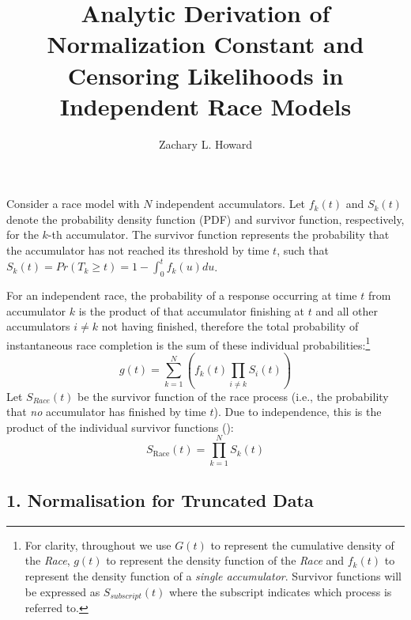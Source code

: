 \documentclass[12pt,a4paper,one side]{article}
\author{Zachary L. Howard}
\title{Analytic Derivation of Normalization Constant and Censoring Likelihoods in Independent Race Models}
\begin{document}
\maketitle

Consider a race model with $N$ independent accumulators. Let $f_k(t)$ and $S_k(t)$ denote the probability density function (PDF) and survivor function, respectively, for the $k$-th accumulator. The survivor function represents the probability that the accumulator has not reached its threshold by time $t$, such that $S_k(t) = Pr(T_k \geq t) = 1 - \int_{0}^{t} f_k(u) du$.

For an independent race, the probability of a response occurring at time $t$ from accumulator $k$ is the product of that accumulator finishing at $t$ and all other accumulators $i \neq k$ not having finished, therefore the total probability of instantaneous race completion is the sum of these individual probabilities:\footnote{For clarity, throughout we use $G(t)$ to represent the cumulative density of the \textit{Race}, $g(t)$ to represent the density function of the \textit{Race} and $f_k(t)$ to represent the density function of a \textit{single accumulator}. Survivor functions will be expressed as $S_{subscript}(t)$ where the subscript indicates which process is referred to.}
\begin{equation}
    g(t) = \sum_{k=1}^{N} \left( f_k(t) \prod_{i \neq k} S_i(t) \right)
    \label{eq:race_density}
\end{equation}
Let $S_{Race}(t)$ be the survivor function of the race process (i.e., the probability that \textit{no} accumulator has finished by time $t$). Due to independence, this is the product of the individual survivor functions ():
\begin{equation}
    S_{\text{Race}}(t) = \prod_{k=1}^{N} S_k(t)
    \label{eq:race_survivor}
\end{equation}

\subsection*{1. Normalisation for Truncated Data}
\end{document}
